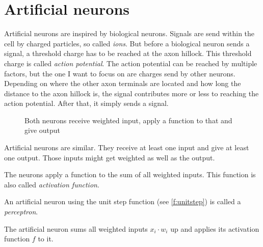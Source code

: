 \section{Artificial neurons}\label{sec:artificial-neurons}

Artificial neurons are inspired by biological neurons. Signals are send within 
the cell by charged particles, so called \textit{ions}. But before a biological
neuron sends a signal, a threshold charge has to be reached at the axon
hillock. This threshold charge is called \textit{action potential}. The action
potential can be reached by multiple factors, but the one I want to focus on
are charges send by other neurons. Depending on where the other axon terminals
are located and how long the distance to the axon hillock is, the signal contributes
more or less to reaching the action potential. After that, it simply sends a
signal.

\begin{figure}[ht]
    \centering
    \label{fig:artificial-and-biological-neuron}
    \caption{Both neurons receive weighted input, apply a function to that and give output}
\end{figure}

Artificial neurons are similar. They receive at least one input and give at
least one output. Those inputs might get weighted as well as the output.

The neurons apply a function to the sum of all weighted inputs. This function
is also called \textit{activation function}.

An artificial neuron using the unit step function (see \cref{f:unitstep}) is called
a \textit{perceptron}.


The artificial neuron sums all weighted inputs $x_i \cdot w_i$ up
             and applies its activation function $f$ to it.